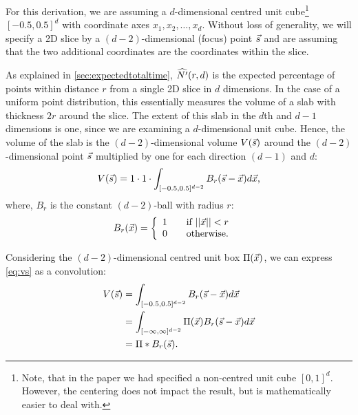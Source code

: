 

For this derivation, we are assuming a $d$-dimensional centred unit cube\footnote{Note, that in the paper we had specified a non-centred unit cube $[0, 1]^d$. However, the centering does not impact the result, but is mathematically easier to deal with.} $[-0.5, 0.5]^d$ with coordinate axes $x_1, x_2, \ldots, x_d$. Without loss of generality, we will specify a 2D slice by a $(d-2)$-dimensional (focus) point $\vec{s}$ and are assuming that the two additional coordinates are the coordinates within the slice.

As explained in \autoref{sec:expectedtotaltime}, $\widehat{N'}(r, d)$ is the expected percentage of points within distance $r$ from a single 2D slice in $d$ dimensions. In the case of a uniform point distribution, this essentially measures the volume of a slab with thickness $2r$ around the slice. The extent of this slab in the $d$th and $d-1$ dimensions is one, since we are examining a $d$-dimensional unit cube. Hence, the volume of the slab is the $(d-2)$-dimensional volume $V(\vec{s})$ around the $(d-2)$-dimensional point $\vec{s}$ multiplied by one for each direction $(d-1)$ and $d$:
\begin{equation}
  V(\vec{s}) = 1 \cdot 1 \cdot \int_{[-0.5,0.5]^{d-2}} B_r(\vec{s}-\vec{x}) d\vec{x} \text{,}
   \label{eq:vs}
\end{equation}
where, $B_r$ is the constant $(d-2)$-ball with radius $r$:
\begin{align*}
  B_r(\vec{x}) &= \left\{ 
  \begin{array}{l l}
    1 & \quad \text{if $||\vec{x}||<r$}\\
    0 & \quad \text{otherwise} \text{.}\\
  \end{array} \right. 
\end{align*}


Considering the $(d-2)$-dimensional centred unit box $\Pi(\vec{x})$, we can express \autoref{eq:vs} as a convolution:
\begin{align*}
  V(\vec{s}) &= \int_{[-0.5,0.5]^{d-2}} B_r(\vec{s}-\vec{x}) d\vec{x}\\
          &= \int_{[-\infty,\infty]^{d-2}} \Pi(\vec{x}) B_r(\vec{s}-\vec{x}) d\vec{x} \\
          &= \Pi * B_r(\vec{s}) \text{.}
\end{align*}

